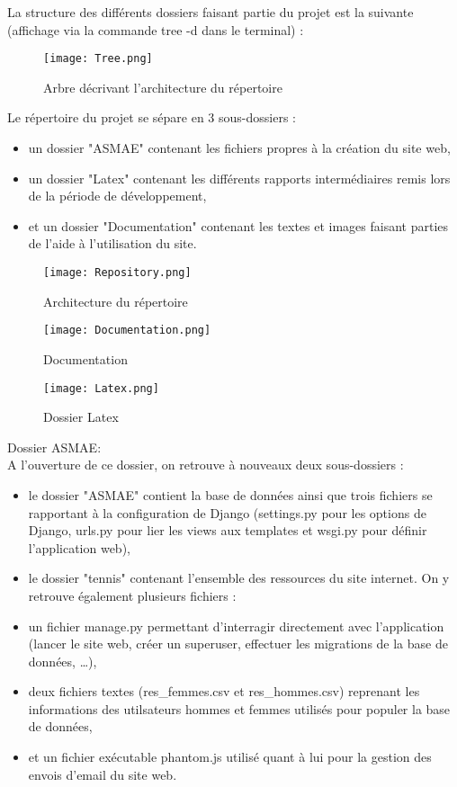 La structure des différents dossiers faisant partie du projet est la suivante (affichage via la commande tree -d dans le terminal) :

\begin{figure}[H]
\centering
\texttt{[image: Tree.png]}
\caption{Arbre décrivant l'architecture du répertoire}
\end{figure}

Le répertoire du projet se sépare en 3 sous-dossiers :

\begin{itemize}
\item un dossier "ASMAE" contenant les fichiers propres à la création du site web,
\item un dossier "Latex" contenant les différents rapports intermédiaires remis lors de la période de développement,
\item et un dossier "Documentation" contenant les textes et images faisant parties de l'aide à l'utilisation du site.
\end{itemize}

\begin{figure}[H]
\centering
\texttt{[image: Repository.png]}
\caption{Architecture du répertoire}
\end{figure}

\begin{figure}[H]
\centering
\texttt{[image: Documentation.png]}
\caption{Documentation}
\end{figure}

\begin{figure}[H]
\centering
\texttt{[image: Latex.png]}
\caption{Dossier Latex}
\end{figure}

Dossier ASMAE:\\

A l'ouverture de ce dossier, on retrouve à nouveaux deux sous-dossiers :\\

\begin{itemize}
	\item le dossier "ASMAE" contient  la base de données ainsi que trois fichiers se rapportant à la configuration de Django (settings.py pour les options de Django, urls.py pour lier les views aux templates et wsgi.py pour définir l'application web), 
	\item le dossier "tennis" contenant l'ensemble des ressources du site internet. On y retrouve également plusieurs fichiers :
	\item un fichier manage.py permettant d'interragir directement avec l'application (lancer le site web, créer un superuser, effectuer les migrations de la base de données, …), 
	\item deux fichiers textes (res\_femmes.csv et res\_hommes.csv) reprenant les informations des utilsateurs hommes et femmes utilisés pour populer la base de données, 
	\item et un fichier exécutable phantom.js utilisé quant à lui pour la gestion des envois d'email du site web.
\end{itemize}

